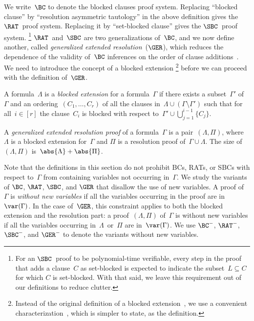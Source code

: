 \documentclass[12pt]{article}
\begin{document}
We write~$\BC$ to denote the blocked clauses proof system.
Replacing ``blocked clause'' by ``resolution asymmetric tautology''
in the above definition gives the $\RAT$~proof system.
Replacing it by ``set-blocked clause'' gives the $\SBC$~proof system.%
\footnote{For an $\SBC$~proof to be polynomial-time verifiable,
  every step in the proof that adds a clause~$C$ as set-blocked
  is expected to indicate the subset~$L \subseteq C$ for which $C$ is set-blocked.
  With that said, we leave this requirement out of our definitions to reduce clutter.}
$\RAT$~and~$\SBC$ are two generalizations of~$\BC$, and we now define another,
called \emph{generalized extended resolution}~($\GER$),
which reduces the dependence of the validity of~$\BC$ inferences
on the order of clause additions~\cite[see][Section~1.3]{Kul99b}.
We need to introduce the concept of a blocked extension%
\footnote{Instead of the original definition
  of a blocked extension~\cite[Definition~6.3]{Kul99b},
  we use a convenient characterization~\cite[Lemma~6.5]{Kul99b},
  which is simpler to state, as the definition.}
before we can proceed with the definition of~$\GER$.

\begin{definition}\label{def:blocked-extension}
  A formula~$\Lambda$ is a \emph{blocked extension} for a formula~$\Gamma$
  if there exists a subset~$\Gamma'$ of~$\Gamma$
  and an ordering~$(C_1, \dots, C_r)$
  of all the clauses in~$\Lambda \cup (\Gamma \setminus \Gamma')$
  such that for all~$i \in [r]$ the clause~$C_i$ is blocked
  with respect to~$\Gamma' \cup \bigcup_{j = 1}^{i - 1} \{C_j\}$.
\end{definition}

\begin{definition}
  A \emph{generalized extended resolution proof} of a formula~$\Gamma$
  is a pair~$(\Lambda, \Pi)$,
  where $\Lambda$ is a blocked extension for~$\Gamma$
  and $\Pi$ is a resolution proof of~$\Gamma \cup \Lambda$.
  The size of~$(\Lambda, \Pi)$ is~$\abs{\Lambda} + \abs{\Pi}$.
\end{definition}

Note that the definitions in this section do not prohibit
BCs, RATs, or SBCs with respect to~$\Gamma$
from containing variables not occurring in~$\Gamma$.
We study the variants of $\BC$, $\RAT$, $\SBC$, and $\GER$
that disallow the use of new variables.
A proof of~$\Gamma$ is \emph{without new variables}
if all the variables occurring in the proof are in~$\var(\Gamma)$.
In the case of~$\GER$, this constraint applies to
both the blocked extension and the resolution part:
a proof~$(\Lambda, \Pi)$ of~$\Gamma$ is without new variables
if all the variables occurring in~$\Lambda$~or~$\Pi$ are in~$\var(\Gamma)$.
We use $\BC^-$, $\RAT^-$, $\SBC^-$, and $\GER^-$
to denote the variants without new variables.
\end{document}
